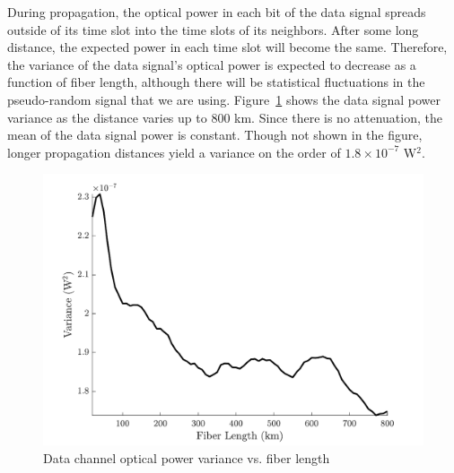 During propagation, the optical power in each bit of the data signal spreads outside of its time slot into the time slots of its neighbors. After some long distance, the expected power in each time slot will become the same. Therefore, the variance of the data signal's optical power is expected to decrease as a function of fiber length, although there will be statistical fluctuations in the pseudo-random signal that we are using. Figure~\ref{fig:NACalcVar} shows the data signal power variance as the distance varies up to $800$ km. Since there is no attenuation, the mean of the data signal power is constant. Though not shown in the figure, longer propagation distances yield a variance on the order of $1.8 \times 10^{-7}$ W$^2$.
%
\begin{figure}[htb]
	\centering
	\includegraphics[scale=0.9]{img/NACalcVar}
	\caption{Data channel optical power variance vs. fiber length} \label{fig:NACalcVar}
\end{figure}
%


